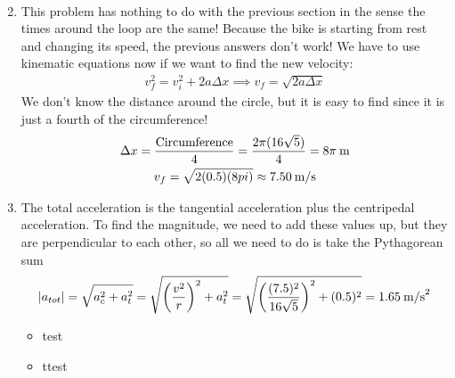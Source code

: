 \documentclass{article}
\begin{document}
\begin{enumerate}
\begin{gather*}
  \end{gather*}
\item This problem has nothing to do with the previous section in the sense the times around the loop are the same!  Because the bike is starting from rest and changing its speed, the previous answers don't work! We have to use kinematic equations now if we want to find the new velocity:
  \begin{gather*}
    v_f^2=v_i^2+2a\Delta x \implies v_f=\sqrt{2a\Delta x}
  \end{gather*}
  We don't know the distance around the circle, but it is easy to find since it is just a fourth of the circumference!
  \begin{gather*}
    \Delta x = \frac{\text{Circumference}}{4} = \frac{2\pi(16\sqrt{5})}{4}=8\pi \text{\:m} \\
    v_f = \sqrt{2(0.5)(8pi)} \approx 7.50 \text{\:m/s}
  \end{gather*}
\item The total acceleration is the tangential acceleration plus the centripedal acceleration.  To find the magnitude, we need to add these values up, but they are perpendicular to each other, so all we need to do is take the Pythagorean sum
  \begin{gather*}
    |a_{tot}|=\sqrt{a_c^2+a_t^2}=\sqrt{ \left(\frac{v^2}{r}\right)^2+a_t^2}=\sqrt{ \left(\frac{(7.5)^2}{16\sqrt{5}}\right)^2+(0.5)^2}=1.65\text{\:m/s}^2
  \end{gather*}


  \begin{itemize}
  \item test
  \item ttest
  \end{itemize}
\end{enumerate}
\end{document}
